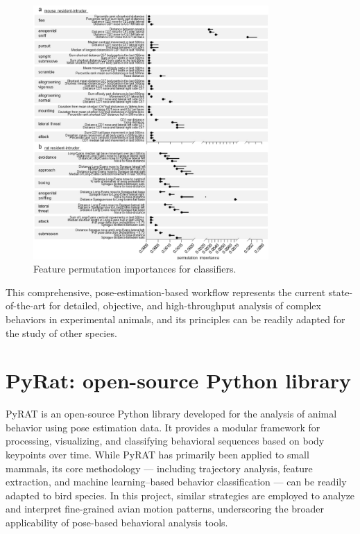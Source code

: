 \begin{figure}[H]
    \centering
    \includegraphics[width=0.8\textwidth]{archivos/figuras/permutation.jpg} 
    \caption{Feature permutation importances for classifiers.}
    \label{fig:feature_importance}
\end{figure}

This comprehensive, pose-estimation-based workflow represents the current state-of-the-art for detailed, objective, and high-throughput analysis of complex behaviors in experimental animals, and its principles can be readily adapted for the study of other species.

\section{PyRat: open-source Python library}

PyRAT is an open-source Python library developed for the analysis of animal behavior using pose estimation data. It provides a modular framework for processing, visualizing, and classifying behavioral sequences based on body keypoints over time. While PyRAT has primarily been applied to small mammals, its core methodology — including trajectory analysis, feature extraction, and machine learning–based behavior classification — can be readily adapted to bird species. In this project, similar strategies are employed to analyze and interpret fine-grained avian motion patterns, underscoring the broader applicability of pose-based behavioral analysis tools.

